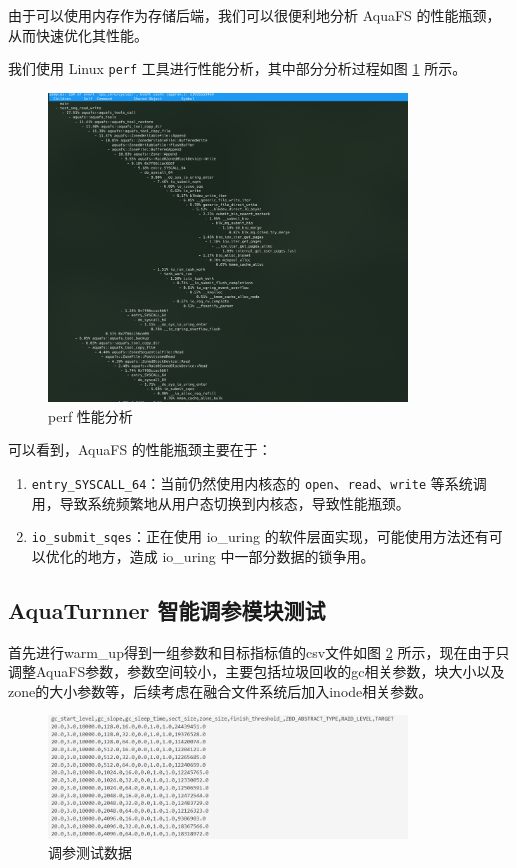 由于可以使用内存作为存储后端，我们可以很便利地分析 AquaFS 的性能瓶颈，从而快速优化其性能。

我们使用 Linux \verb|perf| 工具进行性能分析，其中部分分析过程如图 \ref{test-perf} 所示。

\begin{figure}[htbp]
  \centering
  \includegraphics[width=0.85\textwidth]{fig/test-perf.png}
  \caption{ perf 性能分析 }
  \label{test-perf}
\end{figure}

可以看到，AquaFS 的性能瓶颈主要在于：

\begin{enumerate}
  \item \verb|entry_SYSCALL_64|：当前仍然使用内核态的 \verb|open|、\verb|read|、\verb|write| 等系统调用，导致系统频繁地从用户态切换到内核态，导致性能瓶颈。
  \item \verb|io_submit_sqes|：正在使用 io\_uring 的软件层面实现，可能使用方法还有可以优化的地方，造成 io\_uring 中一部分数据的锁争用。
\end{enumerate}

\subsection{AquaTurnner 智能调参模块测试}

首先进行warm\_up得到一组参数和目标指标值的csv文件如图 \ref{test-turnner1} 所示，现在由于只调整AquaFS参数，参数空间较小，主要包括垃圾回收的gc相关参数，块大小以及zone的大小参数等，后续考虑在融合文件系统后加入inode相关参数。

\begin{figure}[htbp]
  \centering
  \includegraphics[width=0.85\textwidth]{fig/turnner1.png}
  \caption{ 调参测试数据 }
  \label{test-turnner1}
\end{figure}

